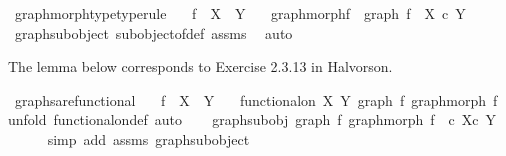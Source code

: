 \begin{isabellebody}
\isanewline
%
\endisadelimproof
\isanewline
{}\isamarkupfalse%
\ graph{\isacharunderscore}{\kern0pt}morph{\isacharunderscore}{\kern0pt}type{\isacharbrackleft}{\kern0pt}type{\isacharunderscore}{\kern0pt}rule{\isacharbrackright}{\kern0pt}{\isacharcolon}{\kern0pt}\isanewline
\ \ \ {\isachardoublequoteopen}f\ {\isacharcolon}{\kern0pt}\ X\ {\isasymrightarrow}\ Y{\isachardoublequoteclose}\isanewline
\ \ \ {\isachardoublequoteopen}graph{\isacharunderscore}{\kern0pt}morph{\isacharparenleft}{\kern0pt}f{\isacharparenright}{\kern0pt}\ {\isacharcolon}{\kern0pt}\ graph\ f\ {\isasymrightarrow}\ X\ {\isasymtimes}\isactrlsub c\ Y{\isachardoublequoteclose}\isanewline
%
\isadelimproof
\ \ %
\endisadelimproof
%
\isatagproof
{}\isamarkupfalse%
\ graph{\isacharunderscore}{\kern0pt}subobject\ subobject{\isacharunderscore}{\kern0pt}of{\isacharunderscore}{\kern0pt}def{}\ assms\ \isamarkupfalse%
\ auto%
\endisatagproof
{\isafoldproof}%
%
\isadelimproof
%
\endisadelimproof
%
\begin{isamarkuptext}%
The lemma below corresponds to Exercise 2.3.13 in Halvorson.%
\end{isamarkuptext}\isamarkuptrue%
\isamarkupfalse%
\ graphs{\isacharunderscore}{\kern0pt}are{\isacharunderscore}{\kern0pt}functional{\isacharcolon}{\kern0pt}\isanewline
\ \ \ {\isachardoublequoteopen}f\ {\isacharcolon}{\kern0pt}\ X\ {\isasymrightarrow}\ Y{\isachardoublequoteclose}\isanewline
\ \ \ {\isachardoublequoteopen}functional{\isacharunderscore}{\kern0pt}on\ X\ Y\ {\isacharparenleft}{\kern0pt}graph\ f{\isacharcomma}{\kern0pt}\ graph{\isacharunderscore}{\kern0pt}morph\ f{\isacharparenright}{\kern0pt}{\isachardoublequoteclose}\isanewline
%
\isadelimproof
%
\endisadelimproof
%
\isatagproof
{}\isamarkupfalse%
{\isacharparenleft}{\kern0pt}unfold\ functional{\isacharunderscore}{\kern0pt}on{\isacharunderscore}{\kern0pt}def{\isacharcomma}{\kern0pt}\ auto{\isacharparenright}{\kern0pt}\isanewline
\ \ \isamarkupfalse%
\ graph{\isacharunderscore}{\kern0pt}subobj{\isacharcolon}{\kern0pt}\ {\isachardoublequoteopen}{\isacharparenleft}{\kern0pt}graph\ f{\isacharcomma}{\kern0pt}\ graph{\isacharunderscore}{\kern0pt}morph\ f{\isacharparenright}{\kern0pt}\ \ {\isasymsubseteq}\isactrlsub c\ {\isacharparenleft}{\kern0pt}X{\isasymtimes}\isactrlsub c\ Y{\isacharparenright}{\kern0pt}{\isachardoublequoteclose}\isanewline
\ \ \ \ \isamarkupfalse%
\ {\isacharparenleft}{\kern0pt}simp\ add{\isacharcolon}{\kern0pt}\ assms\ graph{\isacharunderscore}{\kern0pt}subobject{\isacharparenright}{\kern0pt}\isanewline

\end{isabellebody}
